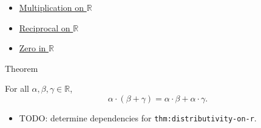 \begin{dependencies}
\begin{itemize}
  \item \hyperref[def:multiplication-on-r]{Multiplication on $\mathbb{R}$}
  \item \hyperref[def:reciprocal-on-r]{Reciprocal on $\mathbb{R}$}
  \item \hyperref[def:zero-in-r]{Zero in $\mathbb{R}$}
\end{itemize}
\end{dependencies}

\begin{theorembox}{Theorem}
\begin{theorem}
\label{thm:distributivity-on-r}
For all $\alpha,\beta,\gamma\in\mathbb{R}$,
\[
\alpha\cdot(\beta+\gamma)=\alpha\cdot\beta+\alpha\cdot\gamma.
\]
\end{theorem}
\end{theorembox}

\begin{dependencies}
\begin{itemize}
  \item TODO: determine dependencies for \texttt{thm:distributivity-on-r}.
\end{itemize}
\end{dependencies}
